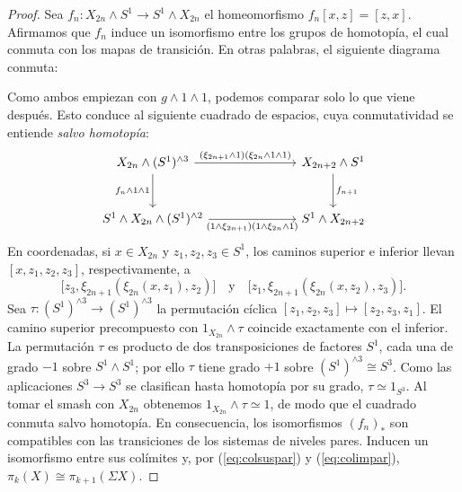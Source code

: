\begin{proof}
Sea $f_n\colon X_{2n}\wedge S^1\longrightarrow S^1\wedge X_{2n}$ el homeomorfismo $f_n[x,z]=[z,x]$. Afirmamos que $f_n$ induce un isomorfismo entre los grupos de homotopía, el cual conmuta con los mapas de transición. En otras palabras, el siguiente diagrama conmuta:



Como ambos empiezan con $g\wedge1\wedge1$, podemos comparar solo lo que viene después. Esto conduce al siguiente cuadrado de espacios, cuya conmutatividad se entiende \emph{salvo homotopía}:
\[
\begin{tikzcd}[column sep=7em,row sep=large]
X_{2n}\wedge(S^1)^{\wedge3} \arrow[r,"(\xi_{2n+1}\wedge1) (\xi_{2n}\wedge1\wedge1)"] \arrow[d,"f_n\wedge1\wedge1"'] & X_{2n+2}\wedge S^1 \arrow[d,"f_{n+1}"] \\
S^1\wedge X_{2n}\wedge(S^1)^{\wedge2} \arrow[r,"(1\wedge\xi_{2n+1}) (1\wedge\xi_{2n}\wedge1)"'] & S^1\wedge X_{2n+2}
\end{tikzcd}
\]
En coordenadas, si $x\in X_{2n}$ y $z_1,z_2,z_3\in S^1$, los caminos superior e inferior llevan $[x,z_1,z_2,z_3]$, respectivamente, a
\[
\bigl[z_3,\xi_{2n+1}(\xi_{2n}(x,z_1),z_2)\bigr]
\quad\text{y}\quad
\bigl[z_1,\xi_{2n+1}(\xi_{2n}(x,z_2),z_3)\bigr].
\]
Sea $\tau\colon(S^1)^{\wedge3}\to(S^1)^{\wedge3}$ la permutación cíclica $[z_1,z_2,z_3]\mapsto[z_2,z_3,z_1]$. El camino superior precompuesto con $1_{X_{2n}}\wedge\tau$ coincide exactamente con el inferior. La permutación $\tau$ es producto de dos transposiciones de factores $S^1$, cada una de grado $-1$ sobre $S^1\wedge S^1$; por ello $\tau$ tiene grado $+1$ sobre $(S^1)^{\wedge3}\cong S^3$. Como las aplicaciones $S^3\to S^3$ se clasifican hasta homotopía por su grado, $\tau\simeq1_{S^3}$. Al tomar el smash con $X_{2n}$ obtenemos $1_{X_{2n}}\wedge\tau\simeq1$, de modo que el cuadrado conmuta salvo homotopía.
En consecuencia, los isomorfismos $(f_n)_*$ son compatibles con las transiciones de los sistemas de niveles pares. Inducen un isomorfismo entre sus colímites y, por (\ref{eq:colsuspar}) y (\ref{eq:colimpar}), $\pi_k(X)\cong\pi_{k+1}(\Sigma X)$.
\end{proof}

